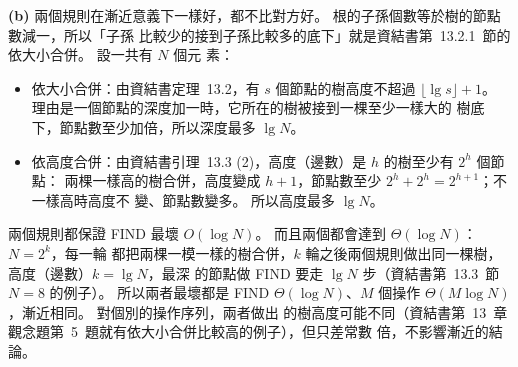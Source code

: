 \begin{pastsoln}
\textbf{(b)} 兩個規則在漸近意義下一樣好，都不比對方好。 根的子孫個數等於樹的節點數減一，所以「子孫
比較少的接到子孫比較多的底下」就是資結書第~13.2.1~節的依大小合併。 設一共有 $N$ 個元
素：
\begin{itemize}
\item 依大小合併：由資結書定理~13.2，有 $s$ 個節點的樹高度不超過
$\lfloor \lg s \rfloor + 1$。 理由是一個節點的深度加一時，它所在的樹被接到一棵至少一樣大的
樹底下，節點數至少加倍，所以深度最多 $\lg N$。
\item 依高度合併：由資結書引理~13.3 (2)，高度（邊數）是 $h$ 的樹至少有 $2^h$ 個節點：
兩棵一樣高的樹合併，高度變成 $h + 1$，節點數至少 $2^h + 2^h = 2^{h+1}$；不一樣高時高度不
變、節點數變多。 所以高度最多 $\lg N$。
\end{itemize}
兩個規則都保證 FIND 最壞 $O(\log N)$。 而且兩個都會達到 $\Theta(\log N)$：$N = 2^k$，每一輪
都把兩棵一模一樣的樹合併，$k$ 輪之後兩個規則做出同一棵樹，高度（邊數）$k = \lg N$，最深
的節點做 FIND 要走 $\lg N$ 步（資結書第~13.3~節 $N = 8$ 的例子）。 所以兩者最壞都是
FIND $\Theta(\log N)$、$M$ 個操作 $\Theta(M \log N)$，漸近相同。 對個別的操作序列，兩者做出
的樹高度可能不同（資結書第~13~章觀念題第~5~題就有依大小合併比較高的例子），但只差常數
倍，不影響漸近的結論。
\end{pastsoln}
